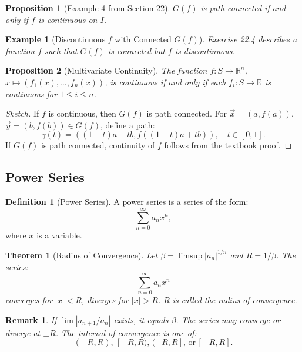 \documentclass[9pt]{article}
\theoremstyle{definition}
\newtheorem{definition}{Definition}
\theoremstyle{plain}
\newtheorem{theorem}{Theorem}
\newtheorem{proposition}{Proposition}
\newtheorem{example}{Example}
\newtheorem{remark}{Remark}
\begin{document}
\begin{proposition}[Example 4 from Section 22]
\( G(f) \) is path connected if and only if \( f \) is continuous on \( I \).
\end{proposition}

\begin{example}[Discontinuous \( f \) with Connected \( G(f) \)]
Exercise 22.4 describes a function \( f \) such that \( G(f) \) is connected but \( f \) is discontinuous.
\end{example}

\begin{proposition}[Multivariate Continuity]
The function \( f : S \to \mathbb{R}^n \), \( x \mapsto (f_1(x), \ldots, f_n(x)) \), is continuous if and only if each \( f_i : S \to \mathbb{R} \) is continuous for \( 1 \leq i \leq n \).
\end{proposition}

\begin{proof}[Sketch]
If \( f \) is continuous, then \( G(f) \) is path connected. For \( \vec{x} = (a, f(a)) \), \( \vec{y} = (b, f(b)) \in G(f) \), define a path:
\[
\gamma(t) = ((1-t)a + tb, f((1-t)a + tb)), \quad t \in [0, 1].
\]
If \( G(f) \) is path connected, continuity of \( f \) follows from the textbook proof.
\end{proof}

\subsection*{Power Series}
\begin{definition}[Power Series]
A power series is a series of the form:
\[
\sum_{n=0}^\infty a_n x^n,
\]
where \( x \) is a variable.
\end{definition}

\begin{theorem}[Radius of Convergence]
Let \( \beta = \limsup |a_n|^{1/n} \) and \( R = 1/\beta \). The series:
\[
\sum_{n=0}^\infty a_n x^n
\]
converges for \( |x| < R \), diverges for \( |x| > R \). \( R \) is called the radius of convergence.
\end{theorem}

\begin{remark}
If \( \lim |a_{n+1}/a_n| \) exists, it equals \( \beta \). The series may converge or diverge at \( \pm R \). The interval of convergence is one of:
\[
(-R, R), \, [-R, R), \, (-R, R], \, \text{or} \, [-R, R].
\]
\end{remark}
\end{document}
